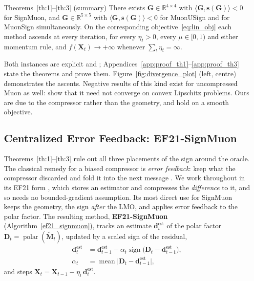 \begin{summarythm}{Theorems~\ref{th:1}--\ref{th:3} (summary)}
There exists $\mathbf{G}\in\mathbb{R}^{4\times4}$ with $\langle\mathbf{G},\mathbf{s}(\mathbf{G})\rangle<0$ for SignMuon, and $\mathbf{G}\in\mathbb{R}^{5\times5}$ with $\langle\mathbf{G},\mathbf{s}(\mathbf{G})\rangle<0$ for MuonUSign and for MuonSign simultaneously. On the corresponding objective~\eqref{eq:lin_obj} each method ascends at every iteration, for every $\eta_t>0$, every $\mu\in[0,1)$ and either momentum rule, and $f(\mathbf{X}_t)\to+\infty$ whenever $\sum_t\eta_t=\infty$.
\end{summarythm}

Both instances are explicit and ; Appendices~\ref{app:proof_th1}--\ref{app:proof_th3} state the theorems and prove them. Figure~\ref{fig:divergence_plot} (left, centre) demonstrates the ascents. Negative results of this kind exist for uncompressed Muon as well: \citet{parshakova2026muondoesconvergeconvex} show that it need not converge on convex Lipschitz problems. Ours are due to the compressor rather than the geometry, and hold on a smooth objective.

\subsection{Centralized Error Feedback: EF21-SignMuon}

Theorems~\ref{th:1}--\ref{th:3} rule out all three placements of the sign around the oracle. The classical remedy for a biased compressor is \emph{error feedback}: keep what the compressor discarded and fold it into the next message \citep{seide20141bit,karimireddy2019efsign}. We work throughout in its EF21 form \citep{richtarik2021ef21}, which stores an estimator and compresses the \emph{difference} to it, and so needs no bounded-gradient assumption. Its most direct use for SignMuon keeps the geometry, the sign \emph{after} the LMO, and applies error feedback to the polar factor. The resulting method, \textbf{EF21-SignMuon} (Algorithm~\ref{ef21_signmuon}), tracks an estimate $\mathbf{d}_t^{\mathrm{est}}$ of the polar factor $\mathbf{D}_t=\operatorname{polar}(\tilde{\mathbf{M}}_t)$, updated by a scaled sign of the residual,
\begin{equation}\label{eq:efsm_est}
\begin{aligned}
\mathbf{d}_t^{\mathrm{est}}&=\mathbf{d}_{t-1}^{\mathrm{est}}+\alpha_t\operatorname{sign}\!\bigl(\mathbf{D}_t-\mathbf{d}_{t-1}^{\mathrm{est}}\bigr),\\
\alpha_t&=\operatorname{mean}\bigl|\mathbf{D}_t-\mathbf{d}_{t-1}^{\mathrm{est}}\bigr|,
\end{aligned}
\end{equation}
and steps $\mathbf{X}_t=\mathbf{X}_{t-1}-\eta_t\,\mathbf{d}_t^{\mathrm{est}}$.


